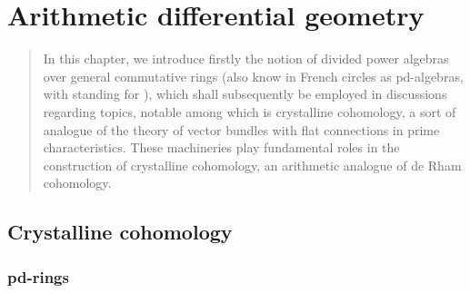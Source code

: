\chapter{Arithmetic differential geometry} \label{chapter: crystals}
    \begin{abstract}
        In this chapter, we introduce firstly the notion of divided power algebras over general commutative rings (also know in French circles as pd-algebras, with  standing for ), which shall subsequently be employed in discussions regarding topics, notable among which is crystalline cohomology, a sort of analogue of the theory of vector bundles with flat connections in prime characteristics. These machineries play fundamental roles in the construction of crystalline cohomology, an arithmetic analogue of de Rham cohomology. 
    \end{abstract}
    
    \minitoc
    
    \section{Crystalline cohomology}
        \subsection{pd-rings}
